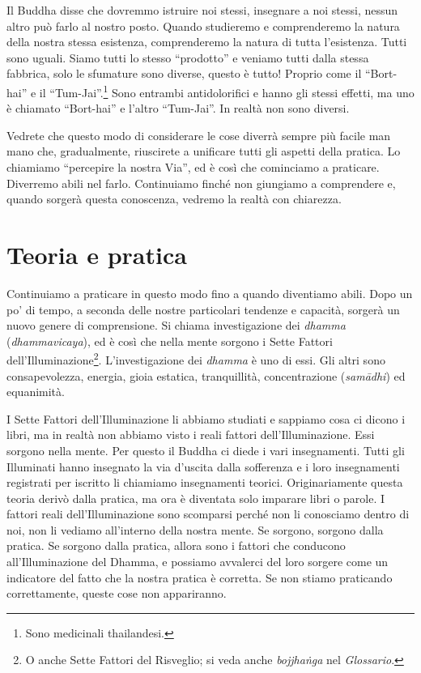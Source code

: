 Il Buddha disse che dovremmo istruire noi stessi, insegnare a noi
stessi, nessun altro può farlo al nostro posto. Quando studieremo e
comprenderemo la natura della nostra stessa esistenza, comprenderemo la
natura di tutta l'esistenza. Tutti sono uguali. Siamo tutti lo stesso
``prodotto'' e veniamo tutti dalla stessa fabbrica, solo le sfumature
sono diverse, questo è tutto! Proprio come il ``Bort-hai'' e il
``Tum-Jai''.\footnote{Sono medicinali thailandesi.} Sono entrambi
antidolorifici e hanno gli stessi effetti, ma uno è chiamato
``Bort-hai'' e l'altro ``Tum-Jai''. In realtà non sono diversi.

Vedrete che questo modo di considerare le cose diverrà sempre più facile
man mano che, gradualmente, riuscirete a unificare tutti gli aspetti
della pratica. Lo chiamiamo ``percepire la nostra Via'', ed è così che
cominciamo a praticare. Diverremo abili nel farlo. Continuiamo finché
non giungiamo a comprendere e, quando sorgerà questa conoscenza, vedremo
la realtà con chiarezza.

\section{Teoria e pratica}

Continuiamo a praticare in questo modo fino a quando diventiamo abili.
Dopo un po' di tempo, a seconda delle nostre particolari tendenze e
capacità, sorgerà un nuovo genere di comprensione. Si chiama
investigazione dei \emph{dhamma} (\emph{dhammavicaya}), ed è così che
nella mente sorgono i Sette Fattori dell'Illuminazione\footnote{O anche
  Sette Fattori del Risveglio; si veda anche \emph{bojjhaṅga} nel
  \emph{Glossario}.}. L'investigazione dei \emph{dhamma} è uno di essi.
Gli altri sono consapevolezza, energia, gioia estatica, tranquillità,
concentrazione (\emph{samādhi}) ed equanimità.

I Sette Fattori dell'Illuminazione li abbiamo studiati e sappiamo cosa
ci dicono i libri, ma in realtà non abbiamo visto i reali fattori
dell'Illuminazione. Essi sorgono nella mente. Per questo il Buddha ci
diede i vari insegnamenti. Tutti gli Illuminati hanno insegnato la via
d'uscita dalla sofferenza e i loro insegnamenti registrati per iscritto
li chiamiamo insegnamenti teorici. Originariamente questa teoria derivò
dalla pratica, ma ora è diventata solo imparare libri o parole. I
fattori reali dell'Illuminazione sono scomparsi perché non li conosciamo
dentro di noi, non li vediamo all'interno della nostra mente. Se
sorgono, sorgono dalla pratica. Se sorgono dalla pratica, allora sono i
fattori che conducono all'Illuminazione del Dhamma, e possiamo avvalerci
del loro sorgere come un indicatore del fatto che la nostra pratica è
corretta. Se non stiamo praticando correttamente, queste cose non
appariranno.

